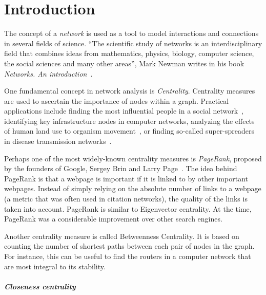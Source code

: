 
\chapter{Introduction}
\label{ch:Introduction}

The concept of a \emph{network} is used as a tool to model interactions and connections in several fields of science. ``The scientific study of networks \textelp{} is an interdisciplinary field that combines ideas from mathematics, physics, biology, computer science, the social sciences and many other areas'', Mark Newman writes in his book \emph{Networks. An introduction}~\cite{newmannetworks}.   

One fundamental concept in network analysis is \emph{Centrality}. Centrality measures are used to ascertain the importance of nodes within a graph. Practical applications include finding the most influential people in a social network~\cite{FREEMAN1978215}, identifying key infrastructure nodes in computer networks, analyzing the effects of human land use to organism movement~\cite{estrada2008using}, or finding so-called super-spreaders in disease transmission networks~\cite{dekker2013network}. 

Perhaps one of the most widely-known centrality measures is \emph{PageRank}, proposed by the founders of Google, Sergey Brin and Larry Page~\cite{page1999pagerank}. The idea behind PageRank is that a webpage is important if it is linked to by other important webpages. Instead of simply relying on the absolute number of links to a webpage (a metric that was often used in citation networks), the quality of the links is taken into account. PageRank is similar to Eigenvector centrality. At the time, PageRank was a considerable improvement over other search engines.

Another centrality measure is called Betweenness Centrality. It is based on counting the number of shortest paths between each pair of nodes in the graph. For instance, this can be useful to find the routers in a computer network that are most integral to its stability.
\paragraph{Closeness centrality}

